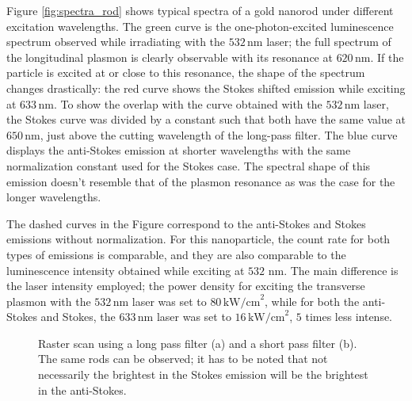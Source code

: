 \documentclass[journal=nalefd,manuscript=letter]{achemso}
\newcommand{\nm}{\ensuremath{\,\textrm{nm}}}
\newcommand{\pwr}{\ensuremath{\,\textrm{kW/cm}^2}}
\begin{document}
Figure \ref{fig:spectra_rod} shows typical spectra of a gold nanorod under
different excitation wavelengths. The green curve is the one-photon-excited
luminescence spectrum observed while irradiating with the $532\nm$ laser; the
full spectrum of the longitudinal plasmon is clearly observable with its
resonance at $620\nm$. If the particle is excited at or close to this resonance,
the shape of the spectrum changes drastically: the red curve shows the Stokes
shifted emission while exciting at $633\nm$. To show the overlap with the
curve obtained with the $532\nm$ laser, the Stokes curve was divided by a
constant such that both have the same value at $650\nm$, just above the cutting
wavelength of the long-pass filter. The blue curve displays the anti-Stokes
emission at shorter wavelengths with the same normalization constant used for
the Stokes case. The spectral shape of this emission doesn't resemble that of
the plasmon resonance as was the case for the longer wavelengths.

The dashed curves in the Figure correspond to the anti-Stokes and Stokes
emissions without normalization. For this nanoparticle, the count rate for both
types of emissions is comparable, and they are also comparable to the
luminescence intensity obtained while exciting at $532\,\nm$. The main
difference is the laser intensity employed; the power density for exciting the
transverse plasmon with the $532\nm$ laser was set to $80\pwr$, while for both
the anti-Stokes and Stokes, the $633\nm$ laser was set to $16\pwr$, $5$ times
less intense. 

\begin{figure}[htp]
\centering
	\caption{Raster scan using a long pass filter (a) and a short pass filter (b).
	The same rods can be observed; it has to be noted that not necessarily the
	brightest in the Stokes emission will be the brightest in the anti-Stokes.}
	\label{fig:shortpass_longpass}
\end{figure}
\end{document}
